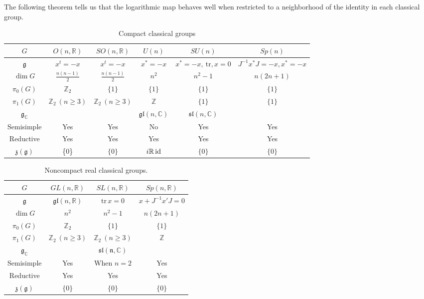 \documentclass{report}
\begin{document}
The following theorem tells us that the logarithmic map behaves well when restricted to a neighborhood of the identity in each classical group.

\begin{table}[h!]
    \centering
    \begin{tabular}{c c c c c c}
        $G$ & $O(n, \mathbb{R})$ & $SO(n, \mathbb{R})$ & $U(n)$ & $SU(n)$ & $Sp(n)$ \\
        \hline \hline
        $\mathfrak{g}$ & $x^t = -x$ & $x^t = -x$ & $x^* = -x$ & $x^* = -x, \ \text{tr}, x = 0$ & $J^{-1}x^*J = -x, x^* = -x$ \\
        $\dim G$ & $\frac{n(n-1)}{2}$ & $\frac{n(n-1)}{2}$ & $n^2$ & $n^2 - 1$ & $n(2n+1)$ \\
        $\pi_0(G)$ & $\mathbb{Z}_2$ & $\{1\}$ & $\{1\}$ & $\{1\}$ & $\{1\}$ \\
        $\pi_1(G)$ & $\mathbb{Z}_2 \ (n \ge 3)$ & $\mathbb{Z}_2 \ (n \ge 3)$ & $\mathbb{Z}$ & $\{1\}$ & $\{1\}$ \\
        $\mathfrak{g}_{\mathbb C}$ &  &  & $\mathfrak{gl}(n, \mathbb C)$ & $\mathfrak{sl}(n, \mathbb C)$ & \\
        Semisimple & Yes & Yes & No & Yes & Yes \\ 
        Reductive & Yes & Yes & Yes & Yes & Yes \\
        $\mathfrak{z}(\mathfrak g)$ & \{0\} & $\{0\}$ & $i \mathbb R \operatorname{id}$ & $\{0\}$ & $\{0\}$ \\
    \end{tabular}
    \caption{Compact classical groups}
    \label{table:classical_groups}
\end{table}

\begin{table}[h!]
    \centering
    \begin{tabular}{c c c c}
        $G$ & $GL(n, \mathbb{R})$ & $SL(n, \mathbb{R})$ & $Sp(n, \mathbb{R})$ \\
        \hline \hline
        $\mathfrak{g}$ & $\mathfrak{gl}(n, \mathbb{R})$ & $\text{tr} \, x = 0$ & $x + J^{-1}x'J = 0$ \\
        $\dim G$ & $n^2$ & $n^2 - 1$ & $n(2n + 1)$ \\
        $\pi_0(G)$ & $\mathbb{Z}_2$ & $\{1\}$ & $\{1\}$ \\
        $\pi_1(G)$ & $\mathbb{Z}_2 \ (n \ge 3)$ & $\mathbb{Z}_2 \ (n \ge 3)$ & $\mathbb{Z}$ \\
        $\mathfrak{g}_{\mathbb C}$ &  & $\mathfrak{sl(n, \mathbb C)}$ &  \\
        Semisimple & Yes & When $n = 2$ & Yes \\
        Reductive & Yes & Yes & Yes \\
        $\mathfrak{z}(\mathfrak g)$ & $\{0\}$ & $\{0\}$ & $\{0\}$ \\
    \end{tabular}
    \caption{Noncompact real classical groups.}
    \label{table:noncompact_real_classical_groups}
\end{table}
\end{document}
